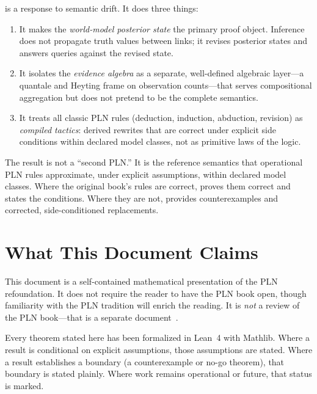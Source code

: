 \documentclass[11pt,openany]{report}
\begin{document}
\xiPLN{} is a response to semantic drift.  It does three things:

\begin{enumerate}
\item It makes the \emph{world-model posterior state} the primary proof object.
  Inference does not propagate truth values between links; it revises posterior
  states and answers queries against the revised state.

\item It isolates the \emph{evidence algebra} as a separate, well-defined
  algebraic layer---a quantale and Heyting frame on observation counts---that
  serves compositional aggregation but does not pretend to be the complete
  semantics.

\item It treats all classic PLN rules (deduction, induction, abduction,
  revision) as \emph{compiled tactics}: derived rewrites that are correct
  under explicit side conditions within declared model classes, not as
  primitive laws of the logic.
\end{enumerate}

The result is not a ``second PLN.''  It is the reference semantics that
operational PLN rules approximate, under explicit assumptions, within declared
model classes.  Where the original book's rules are correct, \xiPLN{} proves
them correct and states the conditions.  Where they are not, \xiPLN{} provides
counterexamples and corrected, side-conditioned replacements.

\section{What This Document Claims}

This document is a self-contained mathematical presentation of the PLN
refoundation.  It does not require the reader to have the PLN book open,
though familiarity with the PLN tradition will enrich the reading.  It is
\emph{not} a review of the PLN book---that is a separate
document~\cite{plnReview2026}.

Every theorem stated here has been formalized in Lean~4 with Mathlib.  Where
a result is conditional on explicit assumptions, those assumptions are stated.
Where a result establishes a boundary (a counterexample or no-go theorem),
that boundary is stated plainly.  Where work remains operational or future,
that status is marked.
\end{document}

